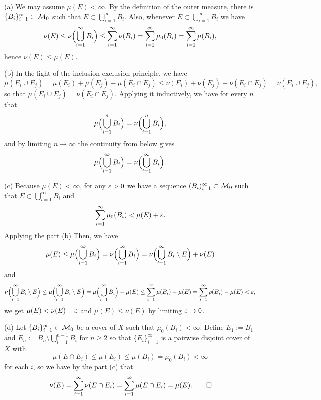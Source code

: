 \documentclass{../../large}
\begin{document}
\begin{pf}
(a)
We may assume $\mu(E)<\infty$.
By the definition of the outer measure, there is $\{B_i\}_{i=1}^\infty\subset\mathcal{M}_0$ such that $E\subset\bigcup_{i=1}^\infty B_i$.
Also, whenever $E\subset\bigcup_{i=1}^\infty B_i$ we have
\[\nu(E)\le\nu\Bigl(\bigcup_{i=1}^\infty B_i\Bigr)\le\sum_{i=1}^\infty\nu(B_i)=\sum_{i=1}^\infty\mu_0(B_i)=\sum_{i=1}^\infty\mu(B_i),\]
hence $\nu(E)\le\mu(E)$.

(b)
In the light of the inclusion-exclusion principle, we have
\[\mu(E_i\cup E_j)=\mu(E_i)+\mu(E_j)-\mu(E_i\cap E_j)\le\nu(E_i)+\nu(E_j)-\nu(E_i\cap E_j)=\nu(E_i\cup E_j),\]
so that $\mu(E_i\cup E_j)=\nu(E_i\cap E_j)$.
Applying it inductively, we have for every $n$ that
\[\mu\Bigl(\bigcup_{i=1}^nB_i\Bigr)=\nu\Bigl(\bigcup_{i=1}^nB_i\Bigr),\]
and by limiting $n\to\infty$ the continuity from below gives
\[\mu\Bigl(\bigcup_{i=1}^\infty B_i\Bigr)=\nu\Bigl(\bigcup_{i=1}^\infty B_i\Bigr).\]

(c)
Because $\mu(E)<\infty$, for any $\varepsilon>0$ we have a sequence $(B_i)_{i=1}^\infty\subset\mathcal{M}_0$ such that $E\subset\bigcup_{i=1}^\infty B_i$ and
\[\sum_{i=1}^\infty\mu_0(B_i)<\mu(E)+\varepsilon.\]
Applying the part (b) 
Then, we have
\[\mu(E)\le\mu\Bigl(\bigcup_{i=1}^\infty B_i\Bigr)=\nu\Bigl(\bigcup_{i=1}^\infty B_i\Bigr)=\nu\Bigl(\bigcup_{i=1}^\infty B_i\setminus E\Bigr)+\nu(E)\]
and
\[\nu\Bigl(\bigcup_{i=1}^\infty B_i\setminus E\Bigr)
\le\mu\Bigl(\bigcup_{i=1}^\infty B_i\setminus E\Bigr)
=\mu\Bigl(\bigcup_{i=1}^\infty B_i\Bigr)-\mu(E)
\le\sum_{i=1}^\infty\mu(B_i)-\mu(E)=\sum_{i=1}^\infty\rho(B_i)-\mu(E)<\varepsilon,\]
we get $\mu(E)<\nu(E)+\varepsilon$ and $\mu(E)\le\nu(E)$ by limiting $\varepsilon\to0$.

(d)
Let $\{B_i\}_{i=1}^\infty\subset\mathcal{M}_0$ be a cover of $X$ such that $\mu_0(B_i)<\infty$.
Define $E_1:=B_1$ and $E_n:=B_n\setminus\bigcup_{i=1}^{n-1}B_i$ for $n\ge2$ so that $\{E_i\}_{i=1}^\infty$ is a pairwise disjoint cover of $X$ with
\[\mu(E\cap E_i)\le\mu(E_i)\le\mu(B_i)=\mu_0(B_i)<\infty\]
for each $i$, so we have by the part (c) that
\[\nu(E)=\sum_{i=1}^\infty\nu(E\cap E_i)=\sum_{i=1}^\infty\mu(E\cap E_i)=\mu(E).\qedhere\]
\end{pf}
\end{document}
